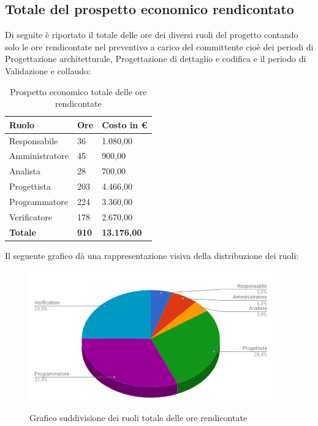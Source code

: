 \documentclass[PianoDiProgetto.tex]{subfiles}
\begin{document}
\subsection{Totale del prospetto economico rendicontato}
Di seguite è riportato il totale delle ore dei diversi ruoli del progetto contando solo le ore rendicontate nel preventivo a carico del committente cioè dei periodi di Progettazione architetturale, Progettazione di dettaglio e codifica e il periodo di Validazione e collaudo:
\begin{center}
	\begin{table}[htbp]
		\centering
		\renewcommand\arraystretch{1.5}
		\begin{tabularx}{\textwidth}{p{5cm}|p{4cm}|p{4cm}}
			\hline
			\textbf{Ruolo} & \textbf{Ore} & \textbf{Costo in \euro} \\
			\hline
			Responsabile & 36 & 1.080,00 \\
			\hline
			Amministratore & 45 & 900,00 \\
			\hline
			Analista & 28 & 700,00 \\
			\hline
			Progettista & 203 & 4.466,00 \\
			\hline
			Programmatore & 224 & 3.360,00 \\
			\hline
			Verificatore & 178 & 2.670,00 \\
			\hline
			\textbf{Totale} & \textbf{910} & \textbf{13.176,00}\\
			\hline
		\end{tabularx}
	\caption{Prospetto economico totale delle ore rendicontate}
	\label{my-label}
	\end{table} 
\end{center}
Il seguente grafico dà una rappresentazione visiva della distribuzione dei ruoli:
\begin{figure}[h]
	\centering
	\includegraphics[width=10.5cm]{images/prospettoEconomico/totRen.png}
	\label{fig:foo}
	\caption{Grafico suddivisione dei ruoli totale delle ore rendicontate}
\end{figure} 
\clearpage
\end{document}
